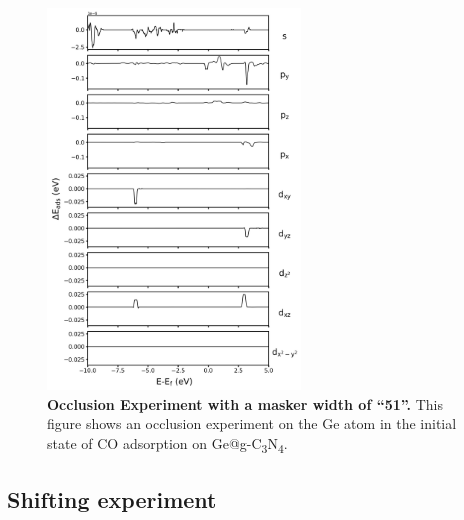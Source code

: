\documentclass[a4paper, 12pt]{article}
\begin{document}
\begin{figure}[htbp]
  \centering
  \includegraphics[width=0.6\textwidth]{supp_fig29_occl_wid51.png}
  \caption{\textbf{Occlusion Experiment with a masker width of ``51''.}
  This figure shows an occlusion experiment on the Ge atom in
  the initial state of CO adsorption on Ge@g-C\textsubscript{3}N\textsubscript{4}.}
  \label{supp_fig29:occl_wid51}
\end{figure}

\subsection{Shifting experiment}
\label{supp_sec3.6_shifting}
\end{document}
